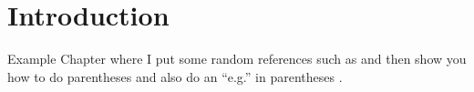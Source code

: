 \chapter{Introduction}
Example Chapter where I put some random references such as \citet{Moscati2019} and then show you how to do parentheses \citep{Chen2018a} and also do an ``e.g.'' in parentheses \citep[e.g.][]{Chen2018a}.